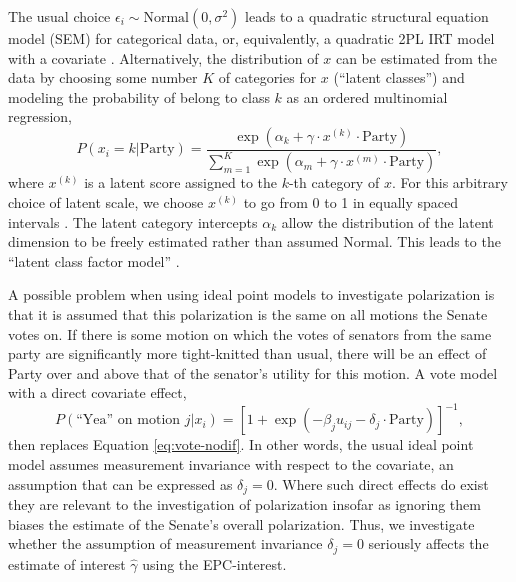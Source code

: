 \documentclass[letterpaper,12pt]{article}
\begin{document}
The usual choice $\epsilon_i \sim \text{Normal}(0, \sigma^2)$  leads to a quadratic structural equation model (SEM) for categorical data, or, equivalently, a quadratic 2PL IRT model with a covariate \citep{rabe2004generalized}. Alternatively, the distribution of $x$ can be estimated from the data by choosing some number $K$ of categories for $x$ (``latent classes'') and modeling the probability of belong to class $k$ as an ordered multinomial regression,
\begin{equation}
	P(x_i = k | \text{Party}) = \frac{\exp(\alpha_k + \gamma \cdot x^{(k)} \cdot \text{Party})}
		{\sum^{K}_{m=1} \exp(\alpha_m + \gamma \cdot x^{(m)} \cdot \text{Party})},
\end{equation}
where $x^{(k)}$ is a latent score assigned to the $k$-th category of $x$. For this arbitrary choice of latent scale, we choose $x^{(k)}$ to go from 0 to 1 in equally spaced intervals \citep[following][]{vermunt2013technical}. The latent category intercepts $\alpha_k$ allow the distribution of the latent dimension to be freely estimated rather than assumed Normal. This leads to the ``latent class factor model'' \citep{vermunt_factor_2004}.



A possible problem when using ideal point models to investigate polarization is that it is assumed that this polarization is the same on all motions the Senate votes on. If there is some motion on which the votes of senators from the same party are significantly more tight-knitted than usual, there will be an effect of Party over and above that of the senator's utility for this motion. A vote model with a direct covariate effect,
\begin{equation}
		P(\text{``Yea'' on motion } j | x_i) = [1 + \exp(-\beta_j u_{ij} - \delta_j \cdot\text{Party})]^{-1},
	\label{eq:vote-dif}
\end{equation}
then replaces Equation \ref{eq:vote-nodif}. In other words, the usual ideal point model assumes measurement invariance with respect to the covariate, an assumption that can be expressed as $\delta_j=0$. Where such direct effects do exist they are relevant to the investigation of polarization insofar as ignoring them biases the estimate of the Senate's overall polarization. Thus, we investigate whether the assumption of measurement invariance $\delta_j=0$  seriously affects the estimate of interest $\hat{\gamma}$ using the EPC-interest.
\end{document}
